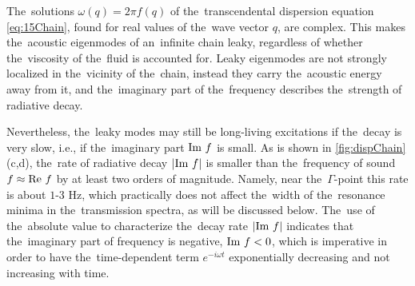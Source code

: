 The~solutions $\omega(q)=2 \pi f(q)$ of the~transcendental dispersion equation \cref{eq:15Chain}, found for real values of the~wave vector $q$, are complex.
This makes the~acoustic eigenmodes of an~infinite chain leaky, regardless of whether the~viscosity of the~fluid is accounted for.
Leaky eigenmodes are not strongly localized in the~vicinity of the~chain, instead they carry the~acoustic energy away from it, and the~imaginary part of the~frequency describes the~strength of radiative decay.

Nevertheless, the~leaky modes may still be long-living excitations if the~decay is very slow, i.e., if the~imaginary part $\textrm{Im } f$ is small.
As is shown in \cref{fig:dispChain}(c,d), the~rate of radiative decay $|\textrm{Im } f|$ is smaller than the~frequency of sound $f \approx \textrm{Re } f$ by at least two orders of magnitude.
Namely, near the~$\Gamma$-point this rate is about $1$-$3$ Hz, which practically does not affect the~width of the~resonance minima in the~transmission spectra, as will be discussed below.
The~use of the~absolute value to characterize the~decay rate $|\textrm{Im } f|$ indicates that the~imaginary part of frequency is negative, $\textrm{Im } f < 0$, which is imperative in order to have the~time-dependent term $e^{-i\omega t}$ exponentially decreasing and not increasing with time.



